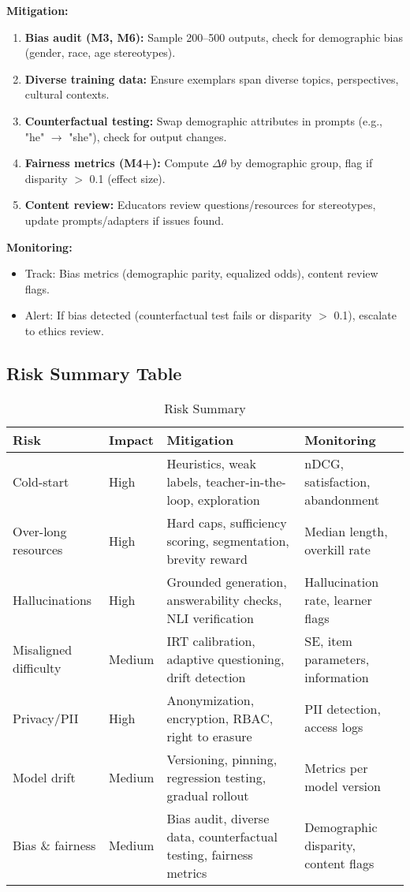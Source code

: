 \documentclass[11pt,letterpaper]{article}
\begin{document}
\textbf{Mitigation:}
\begin{enumerate}
\item \textbf{Bias audit (M3, M6):} Sample 200--500 outputs, check for demographic bias (gender, race, age stereotypes).
\item \textbf{Diverse training data:} Ensure exemplars span diverse topics, perspectives, cultural contexts.
\item \textbf{Counterfactual testing:} Swap demographic attributes in prompts (e.g., "he" $\rightarrow$ "she"), check for output changes.
\item \textbf{Fairness metrics (M4+):} Compute $\Delta\theta$ by demographic group, flag if disparity $>$ 0.1 (effect size).
\item \textbf{Content review:} Educators review questions/resources for stereotypes, update prompts/adapters if issues found.
\end{enumerate}

\textbf{Monitoring:}
\begin{itemize}
\item Track: Bias metrics (demographic parity, equalized odds), content review flags.
\item Alert: If bias detected (counterfactual test fails or disparity $>$ 0.1), escalate to ethics review.
\end{itemize}

\subsection{Risk Summary Table}

\begin{table}[H]
\centering
\small
\begin{tabular}{@{}p{3cm}p{2cm}p{5cm}p{4cm}@{}}
\toprule
\textbf{Risk} & \textbf{Impact} & \textbf{Mitigation} & \textbf{Monitoring} \\
\midrule
Cold-start & High & Heuristics, weak labels, teacher-in-the-loop, exploration & nDCG, satisfaction, abandonment \\
Over-long resources & High & Hard caps, sufficiency scoring, segmentation, brevity reward & Median length, overkill rate \\
Hallucinations & High & Grounded generation, answerability checks, NLI verification & Hallucination rate, learner flags \\
Misaligned difficulty & Medium & IRT calibration, adaptive questioning, drift detection & SE, item parameters, information \\
Privacy/PII & High & Anonymization, encryption, RBAC, right to erasure & PII detection, access logs \\
Model drift & Medium & Versioning, pinning, regression testing, gradual rollout & Metrics per model version \\
Bias \& fairness & Medium & Bias audit, diverse data, counterfactual testing, fairness metrics & Demographic disparity, content flags \\
\bottomrule
\end{tabular}
\caption{Risk Summary}
\end{table}
\end{document}
